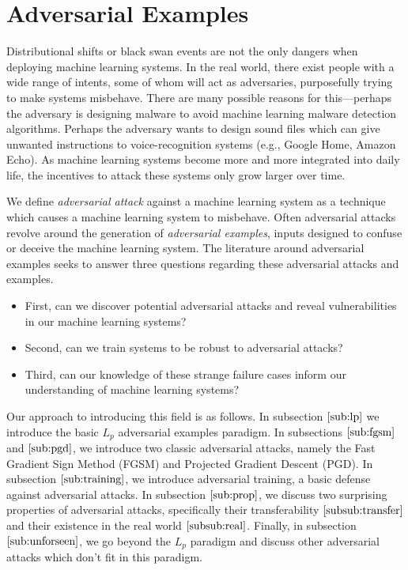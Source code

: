 \documentclass{article}
\begin{document}
\section{Adversarial Examples}
Distributional shifts or black swan events are not the only dangers when deploying machine learning systems. In the real world, there exist people with a wide range of intents, some of whom will act as adversaries, purposefully trying to make systems misbehave. There are many possible reasons for this—perhaps the adversary is designing malware to avoid machine learning malware detection algorithms. Perhaps the adversary wants to design sound files which can give unwanted instructions to voice-recognition systems (e.g., Google Home, Amazon Echo). As machine learning systems become more and more integrated into daily life, the incentives to attack these systems only grow larger over time. 

We define \textit{adversarial attack} against a machine learning system as a technique which causes a machine learning system to misbehave. Often adversarial attacks revolve around the generation of \textit{adversarial examples}, inputs designed to confuse or deceive the machine learning system. The literature around adversarial examples seeks to answer three questions regarding these adversarial attacks and examples. 

\begin{itemize}
    \item First, can we discover potential adversarial attacks and reveal vulnerabilities in our machine learning systems? 
    \item Second, can we train systems to be robust to adversarial attacks?
    \item Third, can our knowledge of these strange failure cases inform our understanding of machine learning systems?
\end{itemize}

\noindent Our approach to introducing this field is as follows. In subsection $\ref{sub:lp}$ we introduce the basic $L_p$ adversarial examples paradigm. In subsections $\ref{sub:fgsm}$ and $\ref{sub:pgd}$, we introduce two classic adversarial attacks, namely the Fast Gradient Sign Method (FGSM) and Projected Gradient Descent (PGD). In subsection $\ref{sub:training}$, we introduce adversarial training, a basic defense against adversarial attacks. In subsection $\ref{sub:prop}$, we discuss two surprising properties of adversarial attacks, specifically their transferability $\ref{subsub:transfer}$ and their existence in the real world $\ref{subsub:real}$. Finally, in subsection $\ref{sub:unforseen}$, we go beyond the $L_p$ paradigm and discuss other adversarial attacks which don't fit in this paradigm.
\end{document}
